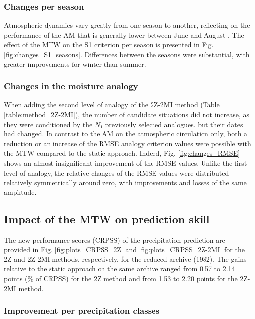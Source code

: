\documentclass[hess, manuscript]{copernicus}
\begin{document}
	
	\subsubsection{Changes per season}
	\label{sec:seasonal_effect}
	
	Atmospheric dynamics vary greatly from one season to another, reflecting on the performance of the AM that is generally lower between June and August \citep{Bliefernicht2010}. The effect of the MTW on the S1 criterion per season is presented in Fig. \ref{fig:changes_S1_seasons}. Differences between the seasons were substantial, with greater improvements for winter than summer. 
	
	
	\subsubsection{Changes in the moisture analogy}
	\label{sec:perf_2Z-2MI}
	
	When adding the second level of analogy of the 2Z-2MI method (Table \ref{table:method_2Z-2MI}), the number of candidate situations did not increase, as they were conditioned by the $N_{1}$ previously selected analogues, but their dates had changed. In contrast to the AM on the atmospheric circulation only, both a reduction or an increase of the RMSE analogy criterion values were possible with the MTW compared to the static approach. Indeed, Fig. \ref{fig:changes_RMSE} shows an almost insignificant improvement of the RMSE values. Unlike the first level of analogy, the relative changes of the RMSE values were distributed relatively symmetrically around zero, with improvements and losses of the same amplitude.
	
	
	\subsection{Impact of the MTW on prediction skill}
	\label{sec:influence_scores}
	
	The new performance scores (CRPSS) of the precipitation prediction are provided in Fig. \ref{fig:plots_CRPSS_2Z} and \ref{fig:plots_CRPSS_2Z-2MI} for the 2Z and 2Z-2MI methods, respectively, for the reduced archive (1982). The gains relative to the static approach on the same archive ranged from 0.57 to 2.14 points (\% of CRPSS) for the 2Z method and from 1.53 to 2.20 points for the 2Z-2MI method. 
	
	
	\subsubsection{Improvement per precipitation classes}
	\label{sec:improvement_CRPSS_precip_threshold}
	
\end{document}

